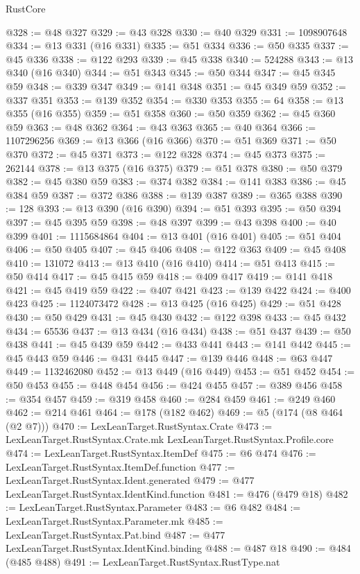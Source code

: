 \begin{lexlean}{RustCore}
\begin{coremodule}
@328 := @48 @327
@329 := @43 @328
@330 := @40 @329
@331 := 1098907648
@334 := @13 @331 (@16 @331)
@335 := @51 @334
@336 := @50 @335
@337 := @45 @336
@338 := @122 @293
@339 := @45 @338
@340 := 524288
@343 := @13 @340 (@16 @340)
@344 := @51 @343
@345 := @50 @344
@347 := @45 @345 @59
@348 := @339 @347
@349 := @141 @348
@351 := @45 @349 @59
@352 := @337 @351
@353 := @139 @352
@354 := @330 @353
@355 := 64
@358 := @13 @355 (@16 @355)
@359 := @51 @358
@360 := @50 @359
@362 := @45 @360 @59
@363 := @48 @362
@364 := @43 @363
@365 := @40 @364
@366 := 1107296256
@369 := @13 @366 (@16 @366)
@370 := @51 @369
@371 := @50 @370
@372 := @45 @371
@373 := @122 @328
@374 := @45 @373
@375 := 262144
@378 := @13 @375 (@16 @375)
@379 := @51 @378
@380 := @50 @379
@382 := @45 @380 @59
@383 := @374 @382
@384 := @141 @383
@386 := @45 @384 @59
@387 := @372 @386
@388 := @139 @387
@389 := @365 @388
@390 := 128
@393 := @13 @390 (@16 @390)
@394 := @51 @393
@395 := @50 @394
@397 := @45 @395 @59
@398 := @48 @397
@399 := @43 @398
@400 := @40 @399
@401 := 1115684864
@404 := @13 @401 (@16 @401)
@405 := @51 @404
@406 := @50 @405
@407 := @45 @406
@408 := @122 @363
@409 := @45 @408
@410 := 131072
@413 := @13 @410 (@16 @410)
@414 := @51 @413
@415 := @50 @414
@417 := @45 @415 @59
@418 := @409 @417
@419 := @141 @418
@421 := @45 @419 @59
@422 := @407 @421
@423 := @139 @422
@424 := @400 @423
@425 := 1124073472
@428 := @13 @425 (@16 @425)
@429 := @51 @428
@430 := @50 @429
@431 := @45 @430
@432 := @122 @398
@433 := @45 @432
@434 := 65536
@437 := @13 @434 (@16 @434)
@438 := @51 @437
@439 := @50 @438
@441 := @45 @439 @59
@442 := @433 @441
@443 := @141 @442
@445 := @45 @443 @59
@446 := @431 @445
@447 := @139 @446
@448 := @63 @447
@449 := 1132462080
@452 := @13 @449 (@16 @449)
@453 := @51 @452
@454 := @50 @453
@455 := @448 @454
@456 := @424 @455
@457 := @389 @456
@458 := @354 @457
@459 := @319 @458
@460 := @284 @459
@461 := @249 @460
@462 := @214 @461
@464 := @178 (@182 @462)
@469 := @5 (@174 (@8 @464 (@2 @7)))
@470 := LexLeanTarget.RustSyntax.Crate
@473 := LexLeanTarget.RustSyntax.Crate.mk LexLeanTarget.RustSyntax.Profile.core
@474 := LexLeanTarget.RustSyntax.ItemDef
@475 := @6 @474
@476 := LexLeanTarget.RustSyntax.ItemDef.function
@477 := LexLeanTarget.RustSyntax.Ident.generated
@479 := @477 LexLeanTarget.RustSyntax.IdentKind.function
@481 := @476 (@479 @18)
@482 := LexLeanTarget.RustSyntax.Parameter
@483 := @6 @482
@484 := LexLeanTarget.RustSyntax.Parameter.mk
@485 := LexLeanTarget.RustSyntax.Pat.bind
@487 := @477 LexLeanTarget.RustSyntax.IdentKind.binding
@488 := @487 @18
@490 := @484 (@485 @488)
@491 := LexLeanTarget.RustSyntax.RustType.nat

\end{coremodule}
\end{lexlean}
